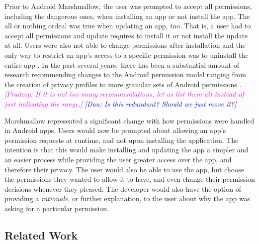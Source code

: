 \documentclass{sig-alternate-05-2015}
\newcommand{\dan}[1]{\textcolor{blue}{{\it [Dan: #1]}}}
\newcommand{\pkm}[1]{\textcolor{magenta}{{\it [Pradeep: #1]}}}
\begin{document}
Prior to Android Marshmallow, the user was prompted to accept all
permissions, including the dangerous ones, when installing an app or
not install the app. The all or nothing ordeal was true when updating
an app, too. That is, a user had to accept all permissions and update
requires to install it or not install the update at all. Users were
also not able to change permissions after installation and the only
way to restrict an app's access to a specific permission was to
uninstall the entire app \cite{Wijesekera:2015:APR:2831143.2831175}.
In the past several years, there has been a substantial amount of
research recommending changes to the Android permission model ranging
from the creation of privacy profiles
\cite{Liu:2014:RMA:2566486.2568035} to more granular sets of Android
permissions \cite{7145666}. \pkm{If it is not too many
recommendations, let us list them all instead of just indicating the
range.}  %
\dan{Is this redundant? Should we just move it?}


Marshmallow represented a significant change with how permissions were
handled in Android apps. Users would now be prompted about allowing an
app's permission requests at runtime, and not upon installing the
application. The intention is that this would make installing and
updating the app a simpler and an easier process while providing the
user greater access over the app, and therefore their privacy. The
user would also be able to use the app, but choose the permissions
they wanted to allow it to have, and even change their permission
decisions whenever they pleased. The developer would also have the
option of providing a \emph{rationale}, or further explanation, to the
user about why the app was asking for a particular permission.





\subsection{Related Work}




%	
\end{document}
